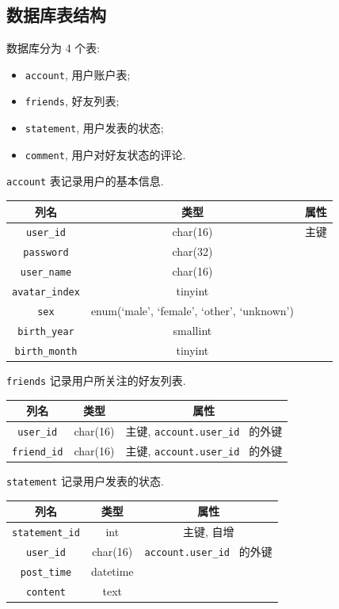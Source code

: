 \documentclass[a4paper,10pt]{article}
\begin{document}
\subsection{数据库表结构}

数据库分为 4 个表:
\begin{itemize}
	\item \texttt{account}, 用户账户表;
	\item \texttt{friends}, 好友列表;
	\item \texttt{statement}, 用户发表的状态;
	\item \texttt{comment}, 用户对好友状态的评论.
\end{itemize}

\texttt{account} 表记录用户的基本信息.
\begin{center}
	\begin{tabular}{ccc} \hline 
		列名 & 类型 & 属性 \\ \hline
		\texttt{user_id} & char(16) & 主键 \\
		\texttt{password} & char(32) & \\
		\texttt{user_name} & char(16) & \\
		\texttt{avatar_index} & tinyint & \\
		\texttt{sex} & enum(`male', `female', `other', `unknown') & \\
		\texttt{birth_year} & smallint & \\
		\texttt{birth_month} & tinyint & \\ \hline
	\end{tabular}
\end{center}

\texttt{friends} 记录用户所关注的好友列表.
\begin{center}
	\begin{tabular}{ccc} \hline 
		列名 & 类型 & 属性 \\ \hline
		\texttt{user_id} & char(16) & 主键, \texttt{account.user_id } 的外键 \\
		\texttt{friend_id} & char(16) & 主键, \texttt{account.user_id } 的外键 \\ \hline
	\end{tabular}
\end{center}

\texttt{statement} 记录用户发表的状态.
\begin{center}
	\begin{tabular}{ccc} \hline 
		列名 & 类型 & 属性 \\ \hline
		\texttt{statement_id} & int & 主键, 自增 \\
		\texttt{user_id} & char(16) & \texttt{account.user_id } 的外键 \\
		\texttt{post_time} &datetime & \\
		\texttt{content} & text & \\ \hline
	\end{tabular}
\end{center}
\end{document}
